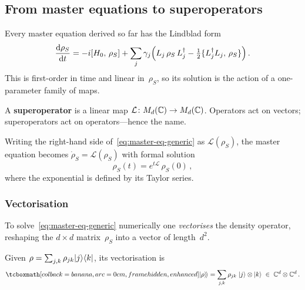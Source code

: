 

\subsection{From master equations to superoperators}%
\label{sec:superoperators}

Every master equation derived so far has the Lindblad form
\begin{equation}\label{eq:master-eq-generic}
  \frac{\mathrm{d}\rho_S}{\mathrm{d} t}
  = -i[H_0,\,\rho_S]
    + \sum_j \gamma_j\Bigl(
      L_j\,\rho_S\, L_j^\dagger
      - \tfrac{1}{2}\{L_j^\dagger L_j,\,\rho_S\}\Bigr)\,.
\end{equation}
This is first-order in time and linear in~$\rho_S$, so its
solution is the action of a one-parameter family of maps.

\begin{definition}[Superoperator]\label{def:superoperator}
  A \textbf{superoperator} is a linear map
  $\mathcal{L}\colon M_{d}(\mathbb{C}) \to M_{d}(\mathbb{C})$.  Operators act on
  vectors; superoperators act on operators---hence the name.
\end{definition}

Writing the right-hand side of~\eqref{eq:master-eq-generic} as
$\mathcal{L}(\rho_S)$, the master equation becomes
$\dot{\rho}_S = \mathcal{L}(\rho_S)$ with formal solution
\begin{equation}\label{eq:formal-solution}
  \rho_S(t) = e^{t\mathcal{L}}\,\rho_S(0)\,,
\end{equation}
where the exponential is defined by its Taylor series.

\subsubsection{Vectorisation}

To solve~\eqref{eq:master-eq-generic} numerically one
\emph{vectorises} the density operator, reshaping the $d\times d$
matrix~$\rho_S$ into a vector of length~$d^2$.

\begin{definition}\label{def:vectorisation}
  Given $\rho = \sum_{j,k}\rho_{jk}\lvert j \rangle\langle k \rvert$, its
  vectorisation is
  \begin{equation}\label{eq:vectorise}
    \eqbox{\ket{\rho}\!\rangle
    = \sum_{j,k} \rho_{jk}\;\ket{j}\tp\ket{k}
    \;\in\; \C^d \tp \C^d}\,.
  \end{equation}
\end{definition}

